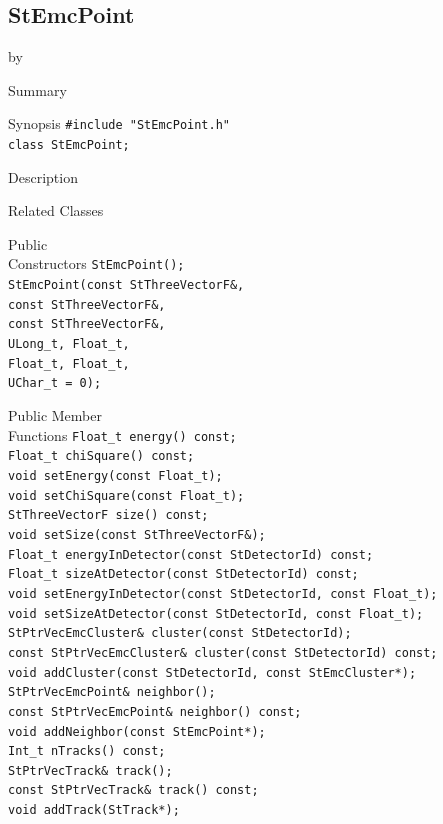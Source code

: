 \documentclass[twoside]{article}
\newcommand{\entrylabel}[1]{\mbox{\textbf{{#1}}}\hfil}%
\newenvironment{entry}
{\begin{list}{}%
    {\renewcommand{\makelabel}{\entrylabel}%
     \setlength{\labelwidth}{90pt}%
     \setlength{\leftmargin}{\labelwidth}
     \advance\leftmargin by \labelsep%
      }%
    }%
  {\end{list}}
\newcommand{\Entrylabel}[1]%
{\raisebox{0pt}[1ex][0pt]{\makebox[\labelwidth][l]%
    {\parbox[t]{\labelwidth}{\hspace{0pt}\textbf{{#1}}}}}}
\newenvironment{Entry}%
{\renewcommand{\entrylabel}{\Entrylabel}\begin{entry}}%
  {\end{entry}}
\begin{document}
\subsection{StEmcPoint}
\label{sec:StEmcPoint}
\begin{Entry}
\item[Summary]
\item[Synopsis]
    \verb+#include "StEmcPoint.h"+\\
    \verb+class StEmcPoint;+\\
\item[Description]
\item[Related Classes]
\item[Public\\ Constructors]
    \verb+StEmcPoint();+\\
    \verb+StEmcPoint(const StThreeVectorF&,+\\
    \verb+const StThreeVectorF&,+\\
    \verb+const StThreeVectorF&,+\\
    \verb+ULong_t, Float_t,+\\
    \verb+Float_t, Float_t,+\\
    \verb+UChar_t = 0);+\\
\item[Public Member\\ Functions]
    \verb+Float_t energy() const;+\\
    \verb+Float_t chiSquare() const;+\\
    \verb+void setEnergy(const Float_t);+\\
    \verb+void setChiSquare(const Float_t);+\\
    \verb+StThreeVectorF size() const;+\\
    \verb+void setSize(const StThreeVectorF&);+\\
    \verb+Float_t energyInDetector(const StDetectorId) const;+\\
    \verb+Float_t sizeAtDetector(const StDetectorId) const;+\\
    \verb+void setEnergyInDetector(const StDetectorId, const Float_t);+\\
    \verb+void setSizeAtDetector(const StDetectorId, const Float_t);+\\
    \verb+StPtrVecEmcCluster& cluster(const StDetectorId);+\\
    \verb+const StPtrVecEmcCluster& cluster(const StDetectorId) const;+\\
    \verb+void addCluster(const StDetectorId, const StEmcCluster*);+\\
    \verb+StPtrVecEmcPoint& neighbor();+\\
    \verb+const StPtrVecEmcPoint& neighbor() const;+\\
    \verb+void addNeighbor(const StEmcPoint*);+\\
    \verb+Int_t nTracks() const;+\\
    \verb+StPtrVecTrack& track();+\\
    \verb+const StPtrVecTrack& track() const;+\\
    \verb+void addTrack(StTrack*);+\\
\end{Entry}
\clearpage
\end{document}
